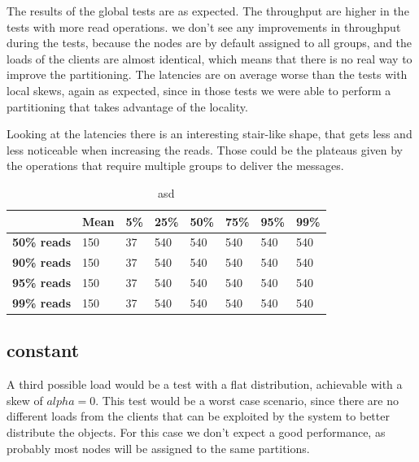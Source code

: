 The results of the global tests are as expected. The throughput are higher in the tests with more read operations. we don't see any improvements in throughput during the tests, because the nodes are by default assigned to all groups, and the loads of the clients are almost identical, which means that there is no real way to improve the partitioning. The latencies are on average worse than the tests with local skews, again as expected, since in those tests we were able to perform a partitioning that takes advantage of the locality.

Looking at the latencies there is an interesting stair-like shape, that gets less and less noticeable when increasing the reads. Those could be the plateaus given by the operations that require multiple groups to deliver the messages.



\begin{table}[!htb]
  \centering
  \begin{tabular}{l l l l l l l l}
    \hline
    & \textbf{Mean} & \textbf{5\%} & \textbf{25\%} & \textbf{50\%} & \textbf{75\%} & \textbf{95\%}& \textbf{99\%} \\
    \hline
    \textbf{50\% reads} & 150 & 37 & 540 & 540 & 540 & 540 & 540 \\
    \textbf{90\% reads} & 150 & 37 & 540 & 540 & 540 & 540 & 540 \\
    \textbf{95\% reads} & 150 & 37 & 540 & 540 & 540 & 540 & 540 \\
    \textbf{99\% reads} & 150 & 37 & 540 & 540 & 540 & 540 & 540 \\
    \hline
  \end{tabular}
  \caption{asd}\label{tab:global-latencies-table}
\end{table}

\subsection{constant}\label{sec:constant}
A third possible load would be a test with a flat distribution, achievable with a skew of $alpha = 0$. This test would be a worst case scenario, since there are no different loads from the clients that can be exploited by the system to better distribute the objects. For this case we don't expect a good performance, as probably most nodes will be assigned to the same partitions.

